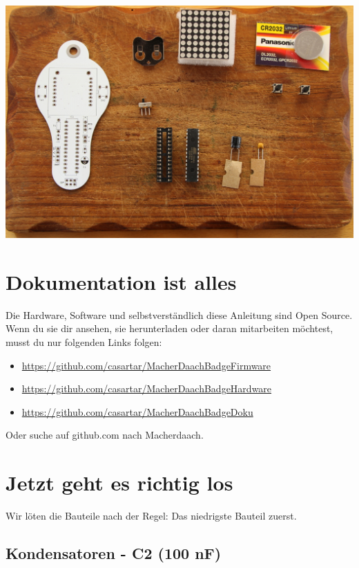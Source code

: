 \documentclass{article}
\begin{document}
\begin{center}
\includegraphics[width=\textwidth]{Bilder2023/IMG_8334.JPG}
\label{fig:all_components}
\end{center}

\section{Dokumentation ist alles}

Die Hardware, Software und selbstverständlich diese Anleitung sind Open Source. Wenn du sie dir ansehen, sie herunterladen oder daran mitarbeiten möchtest, musst du nur folgenden Links folgen:

\begin{itemize}
	\item \url{https://github.com/casartar/MacherDaachBadgeFirmware}
	\item \url{https://github.com/casartar/MacherDaachBadgeHardware}
	\item \url{https://github.com/casartar/MacherDaachBadgeDoku}
\end{itemize}

Oder suche auf github.com nach Macherdaach.

\section{Jetzt geht es richtig los}
Wir löten die Bauteile nach der Regel: Das niedrigste Bauteil zuerst.

\subsection{Kondensatoren - C2 (100 nF)}
\end{document}
